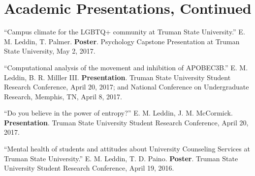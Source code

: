 \documentclass[letterpaper,11pt]{article}
\begin{document}
\section{Academic Presentations, Continued}
\begin{etaremune}[start=4]

  \item \textnormal{``Campus climate for the LGBTQ+ community at Truman State University.'' E. M. Leddin, T. Palmer. \textbf{Poster}. Psychology Capstone Presentation at Truman State University, May 2, 2017.}
  \item \textnormal{``Computational analysis of the movement and inhibition of APOBEC3B.'' E. M. Leddin, B. R. Milller III. \textbf{Presentation}. Truman State University Student Research Conference, April 20, 2017; and National Conference on Undergraduate Research, Memphis, TN, April 8, 2017.}
  \item \textnormal{``Do you believe in the power of entropy?'' E. M. Leddin, J. M. McCormick. \textbf{Presentation}. Truman State University Student Research Conference, April 20, 2017.}
  \item \textnormal{``Mental health of students and attitudes about University Counseling Services at Truman State University.'' E. M. Leddin, T. D. Paino. \textbf{Poster}. Truman State University Student Research Conference, April 19, 2016.}
\end{etaremune}


\end{document}
